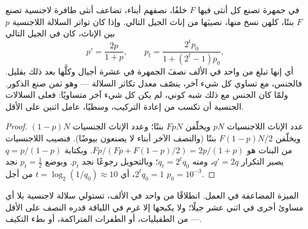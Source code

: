 \begin{theorem}\label{thm:b2:asexual-reproduction:twofold}
في جمهرة تصنع كل أنثى فيها $F$ خلفًا، نصفهم أبناء، تضاعف أنثى طافرة
لاجنسية تصنع $F$ بنتًا، كلهن نسخ منها، نصيبَها من إناث الجيل التالي.
وإذا كان تواتر السلالة اللاجنسية $p$ بين الإناث،
كان في الجيل التالي
\[
p' = \frac{2p}{1 + p}, \qquad p_t = \frac{2^t p_0}{1 + (2^t - 1)p_0},
\]
أي إنها تبلغ من واحد في الألف نصفَ الجمهرة في
عشرة أجيال وكلَّها بعد ذلك بقليل. فالجنس، مع تساوي كل شيء آخر،
ينصّف معدل تكاثر السلالة --- وهو ثمن صنع الذكور. ولمّا كان الجنس
مع ذلك شبه كوني، لم يكن كل شيء آخر متساويًا: فعلى السلالات الجنسية
أن تكسب من إعادة التركيب، وسطيًا، عامل اثنين على الأقل.
\end{theorem}
\begin{proof}
عدد الإناث اللاجنسيات $pN$ ويخلّفن $FpN$ بنتًا؛ وعدد الإناث
الجنسيات $(1 - p)N$ ويخلّفن $F(1 - p)N/2$ بنتًا (والنصف
الآخر أبناء لا يصنعون بيوضًا). فنصيب اللاجنسيات من
البنات هو $Fp/(Fp + F(1 - p)/2) = 2p/(1 + p)$. وبكتابة $q = p/(1 -
p)$ يصير التكرار $q' = 2q$، ومنه $q_t = 2^t q_0$؛ وبالتحويل
رجوعًا نجد $p_t$. وبوضع $p_t = \tfrac12$ نجد $2^t q_0 = 1$، أي
$t = \log_2(1/q_0) \approx 10$ من أجل $p_0 = 10^{-3}$.
\end{proof}

\begin{omfigure}

{\small الميزة المضاعفة في العمل. انطلاقًا من واحد في الألف،
تستولي سلالة لاجنسية بلا أي مساوئ أخرى في اثني عشر جيلًا؛ ولا يكبحها
إلا غرم في اللياقة قدره النصف على الأقل --- من الطفيليات، أو
الطفرات المتراكمة، أو بطء التكيف.}
\end{omfigure}

